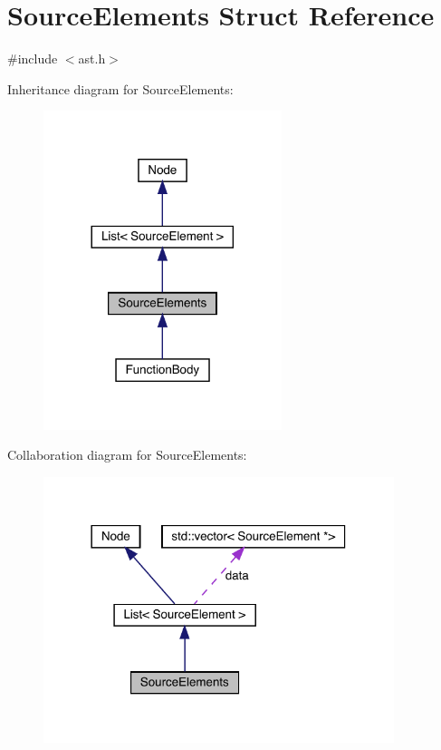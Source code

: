 \hypertarget{struct_source_elements}{}\section{Source\+Elements Struct Reference}
\label{struct_source_elements}


{\ttfamily \#include $<$ast.\+h$>$}



Inheritance diagram for Source\+Elements\+:
\nopagebreak
\begin{figure}[H]
\begin{center}
\leavevmode
\includegraphics[width=197pt]{struct_source_elements__inherit__graph}
\end{center}
\end{figure}


Collaboration diagram for Source\+Elements\+:
\nopagebreak
\begin{figure}[H]
\begin{center}
\leavevmode
\includegraphics[width=290pt]{struct_source_elements__coll__graph}
\end{center}
\end{figure}
